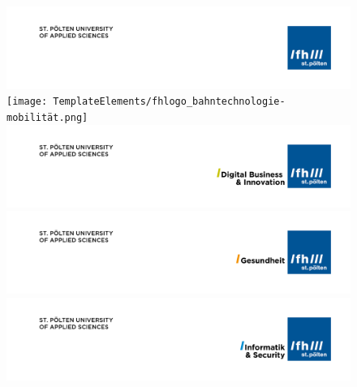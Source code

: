 
\pagestyle{empty}

\begin{figure}[H]
\vspace*{-2.5cm}
\ifuseAllgemein
\hspace*{2.7cm}
	\includegraphics[keepaspectratio, width=1.4\textwidth, right]{TemplateElements/fhlogo_allgemein.png}
\fi
\ifuseBahntechnologieundMobitlitaet
\hspace*{2.7cm}
	\texttt{[image: TemplateElements/fhlogo\_bahntechnologie-mobilität.png]}
\fi
\ifuseDigitalBusinessundInnovation
\hspace*{2.7cm}
	\includegraphics[keepaspectratio, width=1.4\textwidth, right]{TemplateElements/fhlogo_digital-business-innovation.png}
\fi
\ifuseGesundheit
\hspace*{2.7cm}
	\includegraphics[keepaspectratio, width=1.4\textwidth, right]{TemplateElements/fhlogo_gesundheit.png}
\fi
\ifuseInformatikundSecurity
\hspace*{2.7cm}
	\includegraphics[keepaspectratio, width=1.4\textwidth, right]{TemplateElements/fhlogo_informatik-security.png}

\end{figure}
